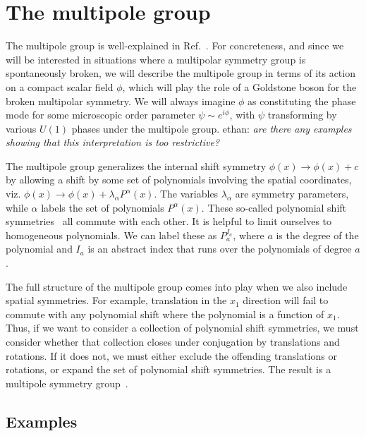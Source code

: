 \documentclass[pra,aps,twocolumn, amsfonts,amsmath,amssymb,nofootinbib,superscriptaddress]{revtex4-2}
\newcommand{\goesto}{\rightarrow}
\newcommand{\ethan}[1]{ { \color{blue} \footnotesize \textsf{ethan: \textsl{#1}} }}
\begin{document}
\section{The multipole group}
\label{multipolegroup}

The multipole group is well-explained in Ref.~\cite{Gromov2019}. For concreteness, and since we will be interested in situations where a multipolar symmetry group is spontaneously broken, we will describe the multipole group in terms of its action on a compact scalar field $\phi$, which will play the role of a Goldstone boson for the broken multipolar symmetry. We will always imagine $\phi$ as constituting the phase mode for some microscopic order parameter $\psi \sim e^{i\phi}$, with $\psi$ transforming by various $U(1)$ phases under the multipole group. \ethan{are there any examples showing that this interpretation is too restrictive?}

 The multipole group generalizes the internal shift symmetry $\phi(x) \goesto\phi (x) +c$ by allowing a shift by some set of polynomials involving the spatial coordinates, viz. $\phi (x) \goesto \phi (x) + \lambda_\alpha P^\alpha(x)$. The variables $\lambda_\alpha$ are symmetry parameters, while $\alpha$ labels the set of polynomials $P^\alpha(x)$. These so-called polynomial shift symmetries~\cite{Griffin2015} all commute with each other. It is helpful to limit ourselves to homogeneous polynomials. We can label these as $P_a^{I_a}$, where $a$ is the degree of the polynomial and $I_a$ is an abstract index that runs over the polynomials of degree $a$.

The full structure of the multipole group comes into play when we also include spatial symmetries. For example,  translation in the $x_1$ direction will fail to commute with any polynomial shift where the polynomial is a function of $x_1$. Thus, if we want to consider a collection of polynomial shift symmetries, we must consider whether that collection closes under conjugation by translations and rotations. If it does not, we must either exclude the offending translations or rotations, or expand the set of polynomial shift symmetries. The result is a multipole symmetry group~\cite{Gromov2019}.

\subsection{Examples} \label{sub:examples}
\end{document}
